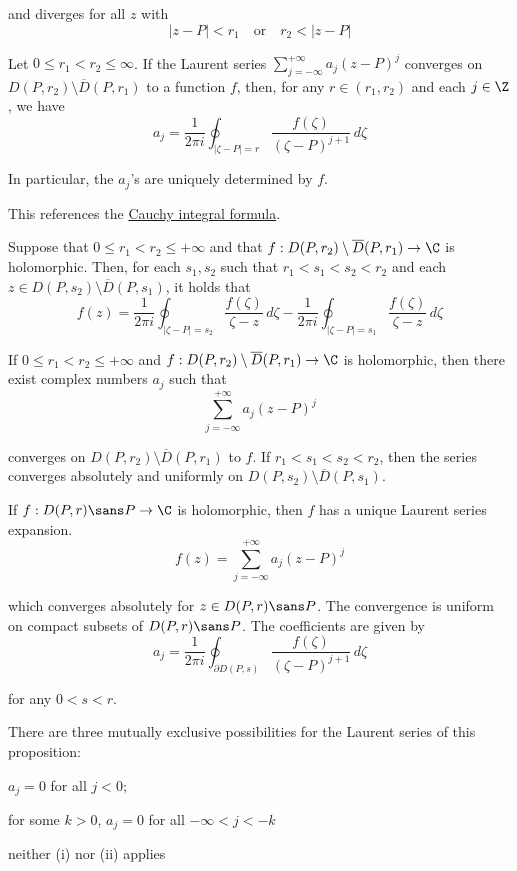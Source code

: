 and diverges for all $z$ with
$$
  |z-P|<r_1\quad\text{or}\quad r_2<|z-P|
$$

\label{eafd61e}

Let $0\leq r_1<r_2\leq\infty$. If the Laurent series
$\sum_{j=-\infty}^{+\infty}a_j(z-P)^j$ converges on $D(P,r_2)\setminus\overline
D(P,r_1)$ to a function $f$, then, for any $r\in(r_1,r_2)$ and each $j\in\Z$,
we have
$$
  a_j=\frac1{2\pi i}\oint_{|\zeta-P|=r}\frac{f(\zeta)}{(\zeta-P)^{j+1}}\,d\zeta
$$

In particular, the $a_j$'s are uniquely determined by $f$.

\label{ca5d89e}

This references the \href{e50677f}{Cauchy integral formula}.

Suppose that $0\leq r_1<r_2\leq+\infty$ and that $f:D(P,r_2)\setminus\overline
D(P,r_1)\to\C$ is holomorphic. Then, for each $s_1,s_2$ such that
$r_1<s_1<s_2<r_2$ and each $z\in D(P,s_2)\setminus\overline D(P,s_1)$, it holds
that
$$
  f(z)=\frac1{2\pi i}\oint_{|\zeta-P|=s_2}\frac{f(\zeta)}{\zeta-z}\,d\zeta
  -\frac1{2\pi i}\oint_{|\zeta-P|=s_1}\frac{f(\zeta)}{\zeta-z}\,d\zeta
$$

\label{cd93e84}

If $0\leq r_1<r_2\leq+\infty$ and $f:D(P,r_2)\setminus\overline D(P,r_1)\to\C$
is holomorphic, then there exist complex numbers $a_j$ such that
$$
  \sum_{j=-\infty}^{+\infty}a_j(z-P)^j
$$

converges on $D(P,r_2)\setminus\overline D(P,r_1)$ to $f$. If
$r_1<s_1<s_2<r_2$, then the series converges absolutely and uniformly on
$D(P,s_2)\setminus\overline D(P,s_1)$.

\label{e7fa5f8}

If $f:D(P,r)\sans P\to\C$ is holomorphic, then $f$ has a unique Laurent series
expansion.
$$
  f(z)=\sum_{j=-\infty}^{+\infty}a_j(z-P)^j
$$

which converges absolutely for $z\in D(P,r)\sans P$. The convergence is uniform
on compact subsets of $D(P,r)\sans P$. The coefficients are given by
$$
  a_j=\frac1{2\pi i}\oint_{\partial D(P,s)}\frac{f(\zeta)}{(\zeta-P)^{j+1}}\,d\zeta
$$

for any $0<s<r$.

There are three mutually exclusive possibilities for the Laurent series of this
proposition:
\begin{enumerati}
  \item $a_j=0$ for all $j<0$;
  \item for some $k>0$, $a_j=0$ for all $-\infty<j<-k$
  \item neither (i) nor (ii) applies
\end{enumerati}


